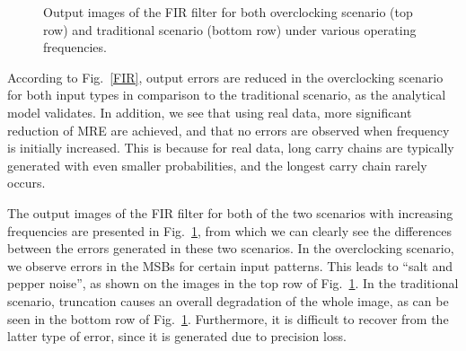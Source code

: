 \documentclass[journal]{IEEEtran}
\begin{document}
\begin{figure}[htbp]
{\begin{minipage}[c]{0.24\textwidth}
  \end{minipage}
  }
\caption{Output images of the FIR filter for both overclocking scenario (top row) and traditional scenario (bottom row) under various operating frequencies.}
\label{FIR_Lena}
\end{figure}

According to Fig.~\ref{FIR}, output errors are reduced in the overclocking scenario for both input types in comparison to the traditional scenario, as the analytical model validates. In addition, we see that using real data, more significant reduction of MRE are achieved, and that no errors are observed when frequency is initially increased. This is because for real data, long carry chains are typically generated with even smaller probabilities, and the longest carry chain rarely occurs.

The output images of the FIR filter for both of the two scenarios with increasing frequencies are presented in Fig.~\ref{FIR_Lena}, from which we can clearly see the differences between the errors generated in these two scenarios. In the overclocking scenario, we observe errors in the MSBs for certain input patterns. This leads to ``salt and pepper noise'', as shown on the images in the top row of Fig.~\ref{FIR_Lena}. In the traditional scenario, truncation causes an overall degradation of the whole image, as can be seen in the bottom row of Fig.~\ref{FIR_Lena}. Furthermore, it is difficult to recover from the latter type of error, since it is generated due to precision loss.
\end{document}

